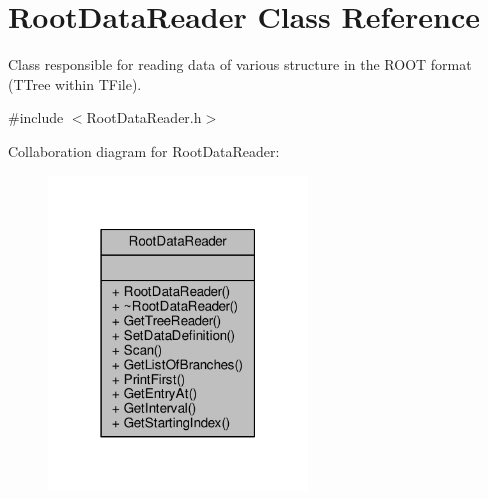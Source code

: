 \hypertarget{classRootDataReader}{\section{Root\+Data\+Reader Class Reference}
\label{classRootDataReader}
}


Class responsible for reading data of various structure in the R\+O\+O\+T format (T\+Tree within T\+File).  




{\ttfamily \#include $<$Root\+Data\+Reader.\+h$>$}



Collaboration diagram for Root\+Data\+Reader\+:
\nopagebreak
\begin{figure}[H]
\begin{center}
\leavevmode
\includegraphics[width=195pt]{classRootDataReader__coll__graph}
\end{center}
\end{figure}
